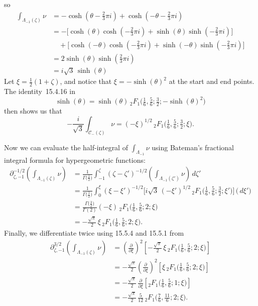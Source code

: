 \documentclass{article}
\theoremstyle{definition}
\newcommand{\fracderiv}[3]{\partial^{#1}_{#2, #3}}
\theoremstyle{plain}
\begin{document}
so
\begin{align*}
\int_{\Lambda_{-1}(\zeta)} \nu & =- \cosh(\theta - \tfrac{2}{3}\pi i) + \cosh(-\theta - \tfrac{2}{3}\pi i) \\
& =- \big[\cosh(\theta) \cosh(-\tfrac{2}{3}\pi i) + \sinh(\theta) \sinh(-\tfrac{2}{3}\pi i)\big] \\
& \quad + \big[\cosh(-\theta) \cosh(-\tfrac{2}{3}\pi i) + \sinh(-\theta) \sinh(-\tfrac{2}{3}\pi i)\big] \\
& = 2\sinh(\theta) \sinh(\tfrac{2}{3}\pi i) \\
& = i\sqrt{3}\,\sinh(\theta)
\end{align*}
Let $\xi = \tfrac{1}{2}(1 + \zeta)$, and notice that $\xi =- \sinh( \theta)^2$ at the start and end points. The identity~15.4.16 in \cite{dlmf}
\[ \sinh(\theta) = \sinh(\theta)\, {}_2F_1\big(\tfrac{1}{6}, \tfrac{5}{6}; \tfrac{3}{2}; -\sinh(\theta)^2\big) \]
then shows us that
\[ -\frac{i}{\sqrt{3}} \int_{\mathcal{C}_-(\zeta)} \nu =  (-\xi)^{1/2}\, {}_2F_1\big(\tfrac{1}{6}, \tfrac{5}{6}; \tfrac{3}{2}; \xi\big). \]

Now we can evaluate the half-integral of $\int_{\Lambda_{-1}} \nu$ using Bateman's fractional integral formula for hypergeometric functions: \begin{align*}
\fracderiv{-1/2}{\zeta}{-1}\left( \int_{\Lambda_{-1}(\zeta)} \nu \right) & = \frac{1}{\Gamma\big(\tfrac{1}{2}\big)} \int_{-1}^\zeta (\zeta - \zeta')^{-1/2} \left( \int_{\Lambda_{-1}(\zeta')} \nu \right)\,d\zeta' \\
& = \frac{1}{\Gamma\big(\tfrac{1}{2}\big)} \int_0^\xi  (\xi - \xi')^{-1/2} \Big[{i}{\sqrt{3}}\, (-\xi')^{1/2}\, {}_2F_1\big(\tfrac{1}{6}, \tfrac{5}{6}; \tfrac{3}{2}; \xi' \big) \Big] \,\big( \,d\xi' \big) \\
& =  \frac{\Gamma\big(\tfrac{3}{2}\big)}{\Gamma(2)} (-\xi)\, {}_2F_1\big(\tfrac{1}{6}, \tfrac{5}{6}; 2; \xi\big) \\
& = - \tfrac{\sqrt{\pi}}{2}\,\xi\,{}_2F_1\big(\tfrac{1}{6}, \tfrac{5}{6}; 2; \xi\big).
\end{align*}
Finally, we differentiate twice using 15.5.4 and 15.5.1 from \cite{dlmf}
\begin{align*}
\fracderiv{3/2}{\zeta}{-1} \left( \int_{\Lambda_{-1}(\zeta)} \nu \right) & = \left(\tfrac{\partial}{\partial \xi}\right)^2 \left[ - \tfrac{\sqrt{\pi}}{2} \,\xi\, {}_2F_1\big(\tfrac{1}{6}, \tfrac{5}{6}; 2; \xi\big) \right] \\
& = - \tfrac{\sqrt{\pi}}{2} \left(\tfrac{\partial}{\partial \xi}\right)^2 \left[ \xi\, {}_2F_1\big(\tfrac{1}{6}, \tfrac{5}{6}; 2; \xi\big) \right] \\
& = - \tfrac{\sqrt{\pi}}{2}\,\tfrac{\partial}{\partial \xi} \left[ {}_2F_1\big(\tfrac{1}{6}, \tfrac{5}{6}; 1; \xi\big) \right] \\
& = - \tfrac{\sqrt{\pi}}{2}\,\tfrac{5}{12}\, {}_2F_1\big(\tfrac{7}{6}, \tfrac{11}{6}; 2; \xi\big).
\end{align*}
\end{document}
